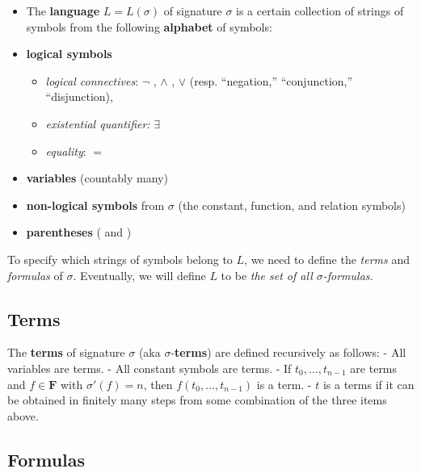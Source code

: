 \documentclass[a4paper,UKenglish,cleveref,autoref,thm-restate,12pt]{lipics-v2021-wjd}
\newcommand{\<}{\langle}
\renewcommand{\>}{\rangle}
\begin{document}
\begin{itemize}
\item
  The \textbf{language} \(L = L(\sigma)\) of signature \(\sigma\) is a
  certain collection of strings of symbols from the following
  \textbf{alphabet} of symbols:
\item
  \textbf{logical symbols}

  \begin{itemize}
  \item
    \emph{logical connectives}: \(\neg\) , \(\wedge\) , \(\vee\) (resp.
    ``negation,'' ``conjunction,'' ``disjunction),
  \item
    \emph{existential quantifier:} \(\exists\)
  \item
    \emph{equality}: \(=\)
  \end{itemize}
\item
  \textbf{variables} (countably many)
\item
  \textbf{non-logical symbols} from \(\sigma\) (the constant, function,
  and relation symbols)
\item
  \textbf{parentheses} ( and )
\end{itemize}

To specify which strings of symbols belong to \(L\), we need to define
the \emph{terms} and \emph{formulas} of \(\sigma\). Eventually, we will
define \(L\) to be \emph{the set of all \(\sigma\)-formulas.}


\subsection{Terms}\label{terms}

The \textbf{terms} of signature \(\sigma\) (aka
\(\sigma\)-\textbf{terms}) are defined recursively as follows: - All
variables are terms. - All constant symbols are terms. - If
\(t_0, \dots, t_{n-1}\) are terms and \(f\in \mathbf F\) with
\(\sigma'(f) = n\), then \(f(t_0,\dots, t_{n-1})\) is a term. - \(t\) is
a terms if it can be obtained in finitely many steps from some
combination of the three items above.


\subsection{Formulas}\label{formulas}
\end{document}
